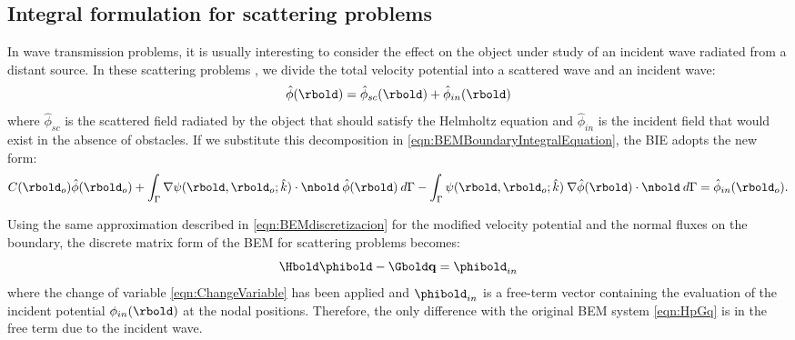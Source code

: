 \subsection{Integral formulation for scattering problems}
In wave transmission problems, it is usually interesting to consider the effect on the object under study of an incident wave radiated from a distant source. In these scattering problems \cite{Wu2000}, we divide the total velocity potential into a scattered wave and an incident wave:
\begin{equation}
\hat\phi(\rbold) = \hat\phi_{sc}(\rbold) + \hat\phi_{in}(\rbold)
\label{eqn:DecompositionScattering}
\end{equation}
where $\hat\phi_{sc}$ is the scattered field radiated by the object that should satisfy the Helmholtz equation and $\hat\phi_{in}$ is the incident field that would exist in the absence of obstacles. If we substitute this decomposition in \eqref{eqn:BEMBoundaryIntegralEquation}, the BIE adopts the new form:
\begin{multline}
C(\rbold_o) \hat{\phi}(\rbold_o)  
+
\int_{\Gamma}  \nabla \psi(\rbold,\rbold_o;\hat{k}) \cdot \nbold \: \hat{\phi}(\rbold) \:d\Gamma
-  
\int_{\Gamma} \psi(\rbold,\rbold_o;\hat{k}) \: \nabla \hat{\phi}(\rbold) \cdot \nbold \:d\Gamma
 = 
\hat\phi_{in}(\rbold_o).
\label{eqn:BEMBoundaryIntegralEquationScattering}
\end{multline}

Using the same approximation described in \eqref{eqn:BEMdiscretizacion} for the modified velocity potential and the normal fluxes on the boundary, the discrete matrix form of the BEM for scattering problems becomes:
%
\begin{equation}
\Hbold \phibold - \Gbold \bold{q} = \phibold_{in}
\label{eqn:BEMBoundaryIntegralEquationScatteringMatrix}
\end{equation}
%
where the change of variable \eqref{eqn:ChangeVariable} has been applied and $\phibold_{in}$ is a free-term vector containing the evaluation of the incident potential $\phi_{in}(\rbold)$ at the nodal positions. Therefore, the only difference with the original BEM system \eqref{eqn:HpGq} is in the free term due to the incident wave.
